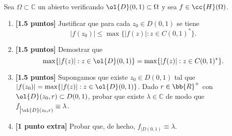 \documentclass[12pt]{article}
\begin{document}
    \begin{ejercicio}
        Sea $\Omega \subset \mathbb{C}$ un abierto verificando $\ol{D}(0, 1) \subset \Omega$ y sea $f \in \cc{H}(\Omega)$.
        \begin{enumerate}
            \item\textbf{[1.5 puntos]} Justificar que para cada $z_0 \in D(0, 1)$ se tiene
            \begin{equation*}
                |f(z_0)| \leq \max\{|f(z)| : z \in C(0, 1)^*\}.
            \end{equation*}

            \item\textbf{[1.5 puntos]} Demostrar que
            \begin{equation*}
                \max\{|f(z)| : z \in \ol{D}(0, 1)\} = \max\{|f(z)| : z \in C(0, 1)^*\}.
            \end{equation*}

            \item\textbf{[1.5 puntos]} Supongamos que existe $z_0 \in D(0, 1)$ tal que $|f(z_0)| = \max\{|f(z)| : z \in \ol{D}(0, 1)\}$. Dado $r\in \bb{R}^+$ con $\ol{D}(z_0, r) \subset D(0, 1)$, probar que existe $\lambda \in \mathbb{C}$ de modo que $f_{\big| \ol{D}(z_0, r)} \equiv \lambda$.
            
            \item\textbf{[1 punto extra]} Probar que, de hecho, $f_{\big| D(0, 1)} \equiv \lambda$.
        \end{enumerate}
    \end{ejercicio}


    \newpage
    \setcounter{ejercicio}{0}
\end{document}
